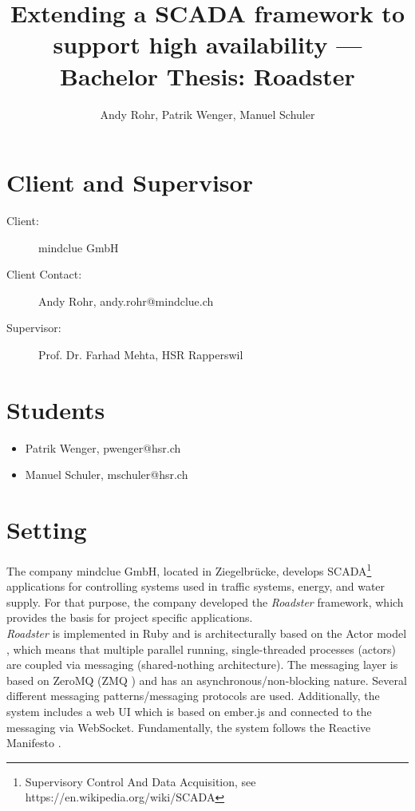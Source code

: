\documentclass[a4paper]{article}
\title{Extending a SCADA framework to support high availability --- Bachelor Thesis: Roadster}
\author{Andy Rohr, Patrik Wenger, Manuel Schuler}
\begin{document}
\lstset{language=ruby}
\pagestyle{fancyplain}
\fancyhf{}
\setlength{\headheight}{50pt}
\maketitle
{}

\section{Client and Supervisor}
\begin{description}
	\item [Client:] mindclue GmbH
	\item [Client Contact:] Andy Rohr, andy.rohr@mindclue.ch
	\item [Supervisor:] Prof. Dr. Farhad Mehta, HSR Rapperswil
\end{description}


\section{Students}
\begin{itemize}
	\item Patrik Wenger, pwenger@hsr.ch
	\item Manuel Schuler, mschuler@hsr.ch
\end{itemize}

\section{Setting}
The company mindclue GmbH, located in Ziegelbrücke, develops
SCADA\footnote{Supervisory Control And Data Acquisition, see
https://en.wikipedia.org/wiki/SCADA} applications for controlling systems used
in traffic systems, energy, and water supply. For that purpose, the company
developed the \emph{Roadster} framework, which provides the basis for project
specific applications.\\

\emph{Roadster} is implemented in Ruby and is architecturally based on the
Actor model \cite{wiki:actor-model}, which means that multiple parallel running,
single-threaded processes (actors) are coupled via messaging (shared-nothing
architecture). The messaging layer is based on ZeroMQ (ZMQ \cite{zeromq}) and
has an asynchronous/non-blocking nature. Several different messaging
patterns/messaging protocols are used. Additionally, the system includes a web
UI which is based on ember.js and connected to the messaging via WebSocket.
Fundamentally, the system follows the Reactive Manifesto
\cite{reactivemanifesto}.\\
\end{document}
